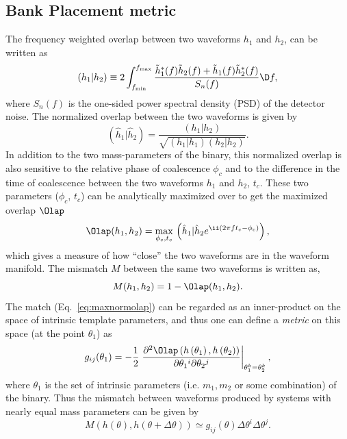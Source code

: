 \subsection{Bank Placement metric}
The frequency weighted overlap between two waveforms $h_1$ and $h_2$, can be
written as
\begin{equation}\label{eq:overlap}
(h_1|h_2) \equiv 2\int^{f_\mathrm{max}}_{f_\mathrm{min}}\dfrac{\tilde{h}_1^*(f)\tilde{h}_2(f) + \tilde{h}_1(f)\tilde{h}_2^*(f)}{S_n(f)}\D f,
\end{equation}
where $S_n(f)$ is the one-sided power spectral density (PSD) of the detector
noise. 
The normalized overlap between the two waveforms is given by
\begin{equation}
(\hat{h}_1|\hat{h}_2) = \dfrac{(h_1|h_2)}{\sqrt{(h_1|h_1)(h_2|h_2)}}.
\end{equation}
In addition to the two mass-parameters of the binary, this normalized overlap
is also sensitive to the relative phase of coalescence $\phi_c$ and to the
difference in the time of coalescence between the two waveforms $h_1$
and $h_2$, $t_c$. These two parameters ($\phi_c$, $t_c$) can be analytically
maximized over to get the maximized overlap $\Olap$
\begin{equation}\label{eq:maxnormolap}
\Olap(h_1,h_2) = \underset{\phi_c,t_c}{\mathrm{max}}\,\left(\hat{h}_1|\hat{h}_2 e^{\ii(2\pi f t_c - \phi_c)}\right),
\end{equation}
which gives a measure of how ``close'' the two waveforms are in the waveform
manifold. The mismatch $M$ between the same two waveforms is written
as, 
\begin{equation}\label{eq:mismatch}
M(h_1,h_2) = 1 - \Olap(h_1,h_2).
\end{equation}
The match (Eq.~\ref{eq:maxnormolap}) can be regarded as an inner-product on
the space of intrinsic template parameters, and thus one can define a 
\textit{metric} on this space \citep{SathyaMetric2PN,OwenTemplateSpacing} (at the point $\theta_1$) as
\begin{equation}\label{eq:metricdef}
 g_{ij}(\theta_1) = -\frac{1}{2}\left.\frac{\partial ^2\Olap\left(h\left(\theta _1\right),h\left(\theta _2\right)\right)}{\partial \theta _1{}^i\partial \theta _2{}^j}\right\vert_{\theta_1^k=\theta^k_2},
\end{equation}
where $\theta_1$ is the set of intrinsic parameters (i.e. $m_1,m_2$ or
some combination) of the binary. Thus the mismatch between waveforms produced by systems with nearly equal mass parameters can be given by
\begin{equation}
 M(h(\theta),h(\theta + \Delta\theta)) \simeq g_{ij}(\theta)\Delta\theta^i\Delta\theta^j.
\end{equation}
